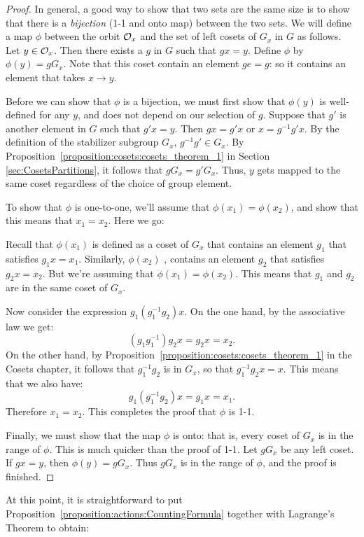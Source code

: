 \begin{proof}
In general, a good way to show that two sets are the same size is to show that there is a \emph{bijection} (1-1 and onto map) between the two sets.  
 We will define a map $\phi$
between the orbit ${\cal O}_x$ and the set of left cosets of $G_x$ in $G$ as follows. Let $y \in {\cal O}_x$. Then there 
exists a $g$ in $G$ such that $g x = y$. Define $\phi$ by $\phi( y ) 
= g G_x$. Note that this coset contain an element $ge=g$:  so it contains an element that takes $x\rightarrow y$.  

Before we can show that $\phi$ is a bijection, we must first show that $\phi(y)$ is well-defined for any $y$, and does 
not depend on our selection of $g$. Suppose that $g'$ is another 
element in $G$ such that $g'x = y$. Then $g x = g' x$ or $x= g^{-1} g' x$. 
By the definition of the stabilizer subgroup $G_x$, $g^{-1}g'\in G_x$. By Proposition~\ref{proposition:cosets:cosets_theorem_1} in Section \ref{sec:CosetsPartitions}, it follows that 
 $g G_x = g' G_x$. Thus, $y$ gets mapped to the same 
coset regardless of the choice of group element.


To show that $\phi$ is one-to-one, we'll assume that $\phi(x_1) =
\phi(x_2)$, and show that this means that $x_1=x_2$. Here we go: 

Recall that $\phi(x_1)$ is defined as a coset of $G_x$ that contains an element $g_1$ that satisfies $g_1x=x_1.$   Similarly,  $\phi(x_2)$ , contains  an element $g_2$ that satisfies $g_2x=x_2$. But we're assuming that $\phi(x_1) =
\phi(x_2)$.  This means that $g_1$ and $g_2$ are in the same coset of $G_x$.  

Now consider the expression $g_1(g_1^{-1}g_2)x$. On the one hand, by the associative law we get:
$$(g_1g_1^{-1})g_2x=g_2x=x_2.$$ 
 On the other hand, by Proposition~\ref{proposition:cosets:cosets_theorem_1} in the Cosets chapter, it follows that $g_1^{-1}g_2$ is in $G_x$, so that $g_1^{-1}g_2x=x$.  This means that we also have:
$$g_1(g_1^{-1}g_2)x=g_1x=x_1.$$
  Therefore $x_1=x_2$.  This completes the proof that $\phi$ is 1-1.

Finally, we must show
that the map $\phi$ is onto: that is, every coset of $G_x$ is in the range of $\phi$. This is much quicker than the proof of 1-1. 
Let $g G_x$ be any  left coset. If $g x =y$, then $\phi(y) = g G_x$.  Thus $gG_x$ is in the range of $\phi$, and the proof is finished.
\end{proof}

At this point, it is straightforward to  put Proposition~\ref{proposition:actions:CountingFormula} together with Lagrange's Theorem to obtain:

